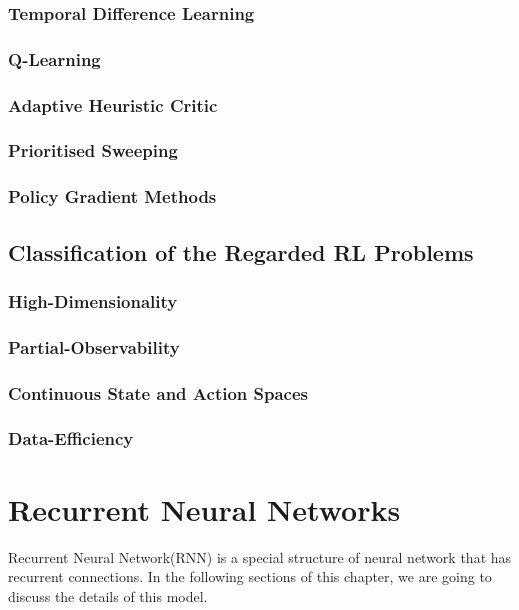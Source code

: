 \documentclass[officiallayout]{tktla}
\begin{document}
\subsection{Temporal Difference Learning}
\subsection{Q-Learning}
\subsection{Adaptive Heuristic Critic}
\subsection{Prioritised Sweeping}
\subsection{Policy Gradient Methods}

\section{Classification of the Regarded RL Problems}
\subsection{High-Dimensionality}
\subsection{Partial-Observability}
\subsection{Continuous State and Action Spaces}
\subsection{Data-Efficiency}

\chapter{Recurrent Neural Networks}
Recurrent Neural Network(RNN) is a special structure of neural network that has recurrent connections. In the following sections of this chapter, we are going to discuss the details of this model.
\end{document}
